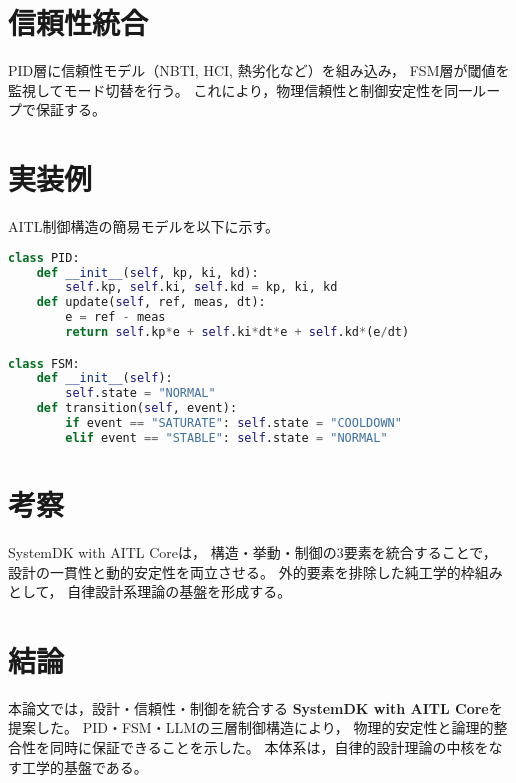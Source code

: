 \documentclass[conference]{IEEEtran}
\begin{document}
\begin{CJK}{UTF8}{min}
\section{信頼性統合}
PID層に信頼性モデル（NBTI, HCI, 熱劣化など）を組み込み，
FSM層が閾値を監視してモード切替を行う。
これにより，物理信頼性と制御安定性を同一ループで保証する。

\section{実装例}
AITL制御構造の簡易モデルを以下に示す。

\begin{lstlisting}[language=Python]
class PID:
    def __init__(self, kp, ki, kd):
        self.kp, self.ki, self.kd = kp, ki, kd
    def update(self, ref, meas, dt):
        e = ref - meas
        return self.kp*e + self.ki*dt*e + self.kd*(e/dt)

class FSM:
    def __init__(self):
        self.state = "NORMAL"
    def transition(self, event):
        if event == "SATURATE": self.state = "COOLDOWN"
        elif event == "STABLE": self.state = "NORMAL"
\end{lstlisting}

\section{考察}
SystemDK with AITL Coreは，
構造・挙動・制御の3要素を統合することで，
設計の一貫性と動的安定性を両立させる。
外的要素を排除した純工学的枠組みとして，
自律設計系理論の基盤を形成する。

\section{結論}
本論文では，設計・信頼性・制御を統合する
\textbf{SystemDK with AITL Core}を提案した。
PID・FSM・LLMの三層制御構造により，
物理的安定性と論理的整合性を同時に保証できることを示した。
本体系は，自律的設計理論の中核をなす工学的基盤である。


\end{CJK}
\end{document}
